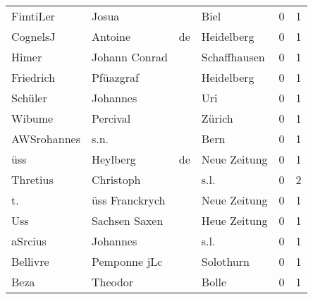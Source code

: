 \begin{tabular}{llllrr}
                 FimtiLer &                              Josua &             &                                        Biel &          0 &         1 \\
                 CognelsJ &                            Antoine &          de &                                  Heidelberg &          0 &         1 \\
                    Himer &                      Johann Conrad &             &                                Schaffhausen &          0 &         1 \\
                Friedrich &                          Pfüazgraf &             &                                  Heidelberg &          0 &         1 \\
                  Schüler &                           Johannes &             &                                         Uri &          0 &         1 \\
                   Wibume &                           Percival &             &                                      Zürich &          0 &         1 \\
              AWSrohannes &                               s.n. &             &                                        Bern &          0 &         1 \\
                      üss &                           Heylberg &          de &                                Neue Zeitung &          0 &         1 \\
                 Thretius &                          Christoph &             &                                        s.l. &          0 &         2 \\
                       t. &                     üss Franckrych &             &                                Neue Zeitung &          0 &         1 \\
                      Uss &                      Sachsen Saxen &             &                                Heue Zeitung &          0 &         1 \\
                  aSrcius &                           Johannes &             &                                        s.l. &          0 &         1 \\
                 Bellivre &                       Pemponne jLc &             &                                   Solothurn &          0 &         1 \\
                     Beza &                            Theodor &             &                                       Bolle &          0 &         1 \\

\end{tabular}
